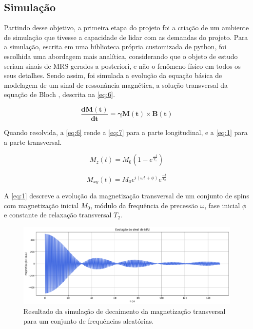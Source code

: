 \documentclass[
12pt,		
twoside, 
a4paper,
chapter=TITLE,
english,			
brazil]{USPSC-classe/USPSC}
\begin{document}
\subsection{Simulação}

Partindo desse objetivo, a primeira etapa do projeto foi a criação de um ambiente de simulação
que tivesse a capacidade de lidar com as demandas do projeto. Para a simulação, escrita em uma biblioteca 
própria customizada de python, foi escolhida uma abordagem mais analítica, considerando que o objeto de estudo seriam
sinais de MRS gerados a posteriori, e não o fenômeno físico em todos os seus detalhes. Sendo assim, foi simulada a evolução 
da equação básica de modelagem de um sinal de ressonância magnética, a solução transversal da equação de Bloch \cite{}, 
descrita na \autoref{eq:6}.

\begin{equation} \label{eq:6}
    \mathbf{\frac{dM(t)}{dt}} = \mathbf{\gamma M(t)} \times \mathbf{B(t)}
\end{equation}

Quando resolvida, a \autoref{eq:6} rende a \autoref{eq:7} para a parte longitudinal, e a \autoref{eq:1} para a parte transversal.

\begin{equation} \label{eq:7}
    M_z(t) = M_0 (1 - e^{\frac{-t}{T_1}})
\end{equation}

\begin{equation} \label{eq:1}
    M_{xy}(t) = M_0 e^{i(\omega t + \phi)} e^{\frac{-t}{T_2}}
\end{equation}

A \autoref{eq:1} descreve a evolução da magnetização transversal de um conjunto de spins com magnetização inicial $M_0$, módulo da frequência de precessão $\omega$, fase inicial $\phi$ e constante 
de relaxação transversal $T_2$. 

\begin{figure} [H]
    \includegraphics[scale=0.28]{sinal_simulado.png}
    \centering
    \caption{Resultado da simulação de decaimento da magnetização transversal para um conjunto de frequências aleatórias.}
    \label{fig:3}
\end{figure}
\end{document}
